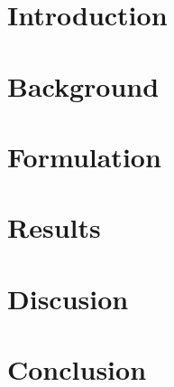 
\section{Introduction}
\label{sec:introduction}


%

\section{Background}
\label{sec:background}


%

\section{Formulation}
\label{sec:formulation}


%

\clearpage

\section{Results}
\label{sec:results}


%

\section{Discusion}
\label{sec:discusion}


%

\section{Conclusion}
\label{sec:conclusion}




